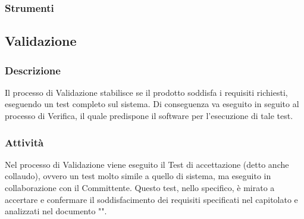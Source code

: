    \subsubsection{Strumenti}

  \subsection{Validazione}
    \subsubsection{Descrizione}
      Il processo di Validazione stabilisce se il prodotto soddisfa i requisiti richiesti, eseguendo un test completo sul sistema. Di conseguenza va eseguito in seguito al processo di Verifica, il quale predispone il software per l'esecuzione di tale test.

    \subsubsection{Attività}
        Nel processo di Validazione viene eseguito il Test di accettazione (detto anche collaudo), ovvero un test molto simile a quello di sistema, ma eseguito in collaborazione con il Committente. Questo test, nello specifico, è mirato a accertare e confermare il soddisfacimento dei requisiti specificati nel capitolato e analizzati nel documento "\AdR{}".
